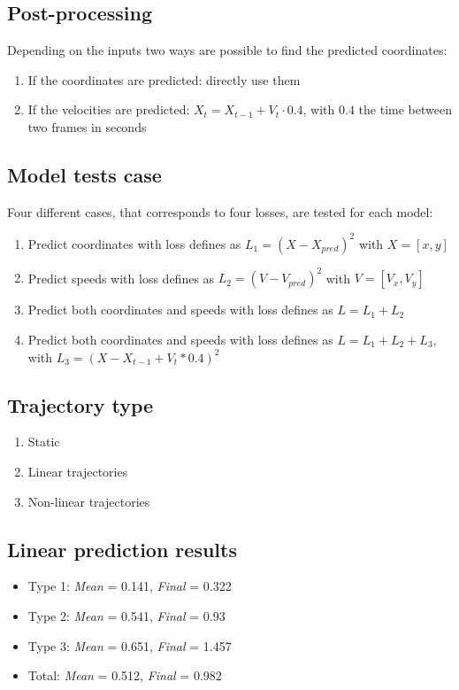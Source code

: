 \documentclass[a0,portrait]{a0poster}
\begin{document}
\begin{multicols}{2}
\subsection*{Post-processing}
Depending on the inputs two ways are possible to find the predicted coordinates:
\begin{enumerate}
\justifying
\item If the coordinates are predicted: directly use them
\item If the velocities are predicted: $X_{t} = X_{t-1} + V_{t}\cdot 0.4$, with $0.4$ the time between two frames in seconds
\end{enumerate}

\subsection*{Model tests case}
Four different cases, that corresponds to four losses, are tested for each model:
\begin{enumerate}
\justifying
\item Predict coordinates with loss defines as $L_1 = (X-X_{pred})^2$ with $X = [x,y]$
\item Predict speeds with loss defines as $L_2 = (V-V_{pred})^2$ with $V = [V_x,V_y]$ 
\item Predict both coordinates and speeds with loss defines as $L = L_1 + L_2$
\item Predict both coordinates and speeds with loss defines as $L = L_1 + L_2 + L_3 $, with $L_3 = (X- X_{t-1} + V_t*0.4)^2$
\end{enumerate}
\vspace{0.5cm}
\begin{minipage}[]{0.5\linewidth}
\subsection*{Trajectory type}
\begin{enumerate}
\justifying
\item Static
\item Linear trajectories
\item Non-linear trajectories
\end{enumerate}
\end{minipage}
\hfill
\begin{minipage}[]{0.5\linewidth}
\subsection*{Linear prediction results}
\begin{itemize}
\item Type 1: \emph{Mean} = 0.141, \emph{Final} = 0.322
\item Type 2: \emph{Mean} = 0.541, \emph{Final} = 0.93
\item Type 3: \emph{Mean} = 0.651, \emph{Final} = 1.457
\item Total: \emph{Mean} = 0.512, \emph{Final} = 0.982 
\end{itemize}
\end{minipage}


\end{multicols}
\end{document}
